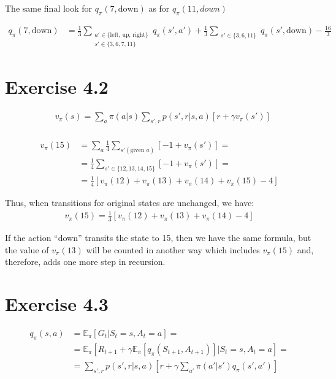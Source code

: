 \documentclass[12pt]{article}
\begin{document}
        The same final look for $q_\pi(7,\text{down})$ as for $q_\pi(11, down)$

        \begin{align*}
            q_\pi(7,\text{down}) &= \frac{1}{3} \sum\limits_{\substack{a' \in \{\text{left, up, right}\} \\ s' \in \{3, 6, 7, 11\}}} q_\pi(s',a') + \frac{1}{3} \sum\limits_{\substack{s' \in \{3, 6, 11\}}} q_\pi(s',\text{down}) - \frac{16}{3}
        \end{align*}

    \section{Exercise 4.2}
        \begin{align*}
            &v_\pi(s) = \sum\limits_a \pi(a|s)\sum\limits_{s',r} p(s',r|s,a)[r +
            \gamma v_\pi(s')]\\
        \end{align*}

        \begin{align*}
            v_\pi(15) &= \sum\limits_a \frac{1}{4} \sum\limits_{s' (\text{given }a)} [-1 + v_\pi(s')] =\\
            &= \frac{1}{4} \sum\limits_{s' \in \{12, 13, 14, 15\}} [-1 + v_\pi(s')] =\\
            &= \frac{1}{4} [v_\pi(12) + v_\pi(13) + v_\pi(14) + v_\pi(15) - 4]
        \end{align*}

        Thus, when transitions for original states are unchanged, we have:
        \begin{align*}
            v_\pi(15) = \frac{1}{3} [v_\pi(12) + v_\pi(13) + v_\pi(14) - 4]
        \end{align*}

        If the action ``down'' transits the state to 15, then we have the same formula,
        but the value of $v_\pi(13)$ will be counted in another way which includes $v_\pi(15)$ and, therefore, adds one more step in recursion.

    \section{Exercise 4.3}
        \begin{align*}
            q_\pi(s,a) &= \mathbb{E}_\pi[G_t|S_t=s,A_t=a] =\\
            &= \mathbb{E}_\pi[R_{t+1} + \gamma \mathbb{E}_\pi[q_\pi(S_{t+1},A_{t+1})]
            |S_t=s,A_t=a] =\\
            &= \sum\limits_{s',r} p(s',r|s,a)[r +
            \gamma \sum\limits_{a'} \pi(a'|s') q_\pi(s',a')]
        \end{align*}
\end{document}
